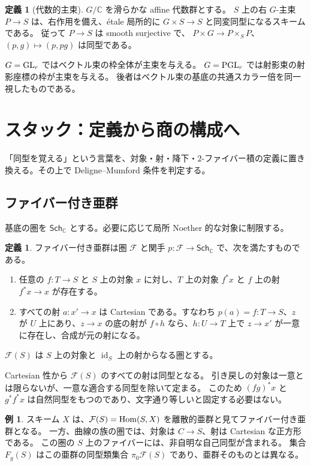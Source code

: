 \documentclass[dvipdfmx,a4paper,11pt]{article}
\theoremstyle{definition}
\newtheorem{dfn}[thm]{定義}
\newtheorem{exa}[thm]{例}
\newenvironment{aim}{\begin{tcolorbox}[mybox,colback=green!3,title=この章で考えること,fonttitle=\bfseries]}{\end{tcolorbox}}
\newcommand{\C}{\mathbb C}\newcommand{\R}{\mathbb R}\newcommand{\Z}{\mathbb Z}\newcommand{\Q}{\mathbb Q}
\newcommand{\id}{\operatorname{id}}
\begin{document}
\begin{dfn}[代数的主束]
$G/\C$ を滑らかな affine 代数群とする。
$S$ 上の右 $G$-主束 $P\to S$ は、右作用を備え、étale 局所的に $G\times S\to S$ と同変同型になるスキームである。
従って $P\to S$ は smooth surjective で、
$P\times G\to P\times_SP$、$(p,g)\mapsto(p,pg)$ は同型である。
\end{dfn}
$G=\operatorname{GL}_r$ ではベクトル束の枠全体が主束を与える。
$G=\operatorname{PGL}_r$ では射影束の射影座標の枠が主束を与える。
後者はベクトル束の基底の共通スカラー倍を同一視したものである。

\par\bigskip\Needspace{.70\textheight}
\section{スタック：定義から商の構成へ}\label{sec:stacks}
\begin{aim}
「同型を覚える」という言葉を、対象・射・降下・$2$-ファイバー積の定義に置き換える。その上で Deligne--Mumford 条件を判定する。
\end{aim}
\subsection{ファイバー付き亜群}
基底の圏を $\mathsf{Sch}_{\C}$ とする。必要に応じて局所 Noether 的な対象に制限する。
\begin{dfn}\label{def:cfg}
ファイバー付き亜群は圏 $\mathcal F$ と関手 $p:\mathcal F\to\mathsf{Sch}_{\C}$ で、次を満たすものである。
\begin{enumerate}
\item 任意の $f:T\to S$ と $S$ 上の対象 $x$ に対し、$T$ 上の対象 $f^*x$ と $f$ 上の射 $f^*x\to x$ が存在する。
\item すべての射 $a:x'\to x$ は Cartesian である。すなわち $p(a)=f:T\to S$、$z$ が $U$ 上にあり、$z\to x$ の底の射が $f\circ h$ なら、$h:U\to T$ 上で $z\to x'$ が一意に存在し、合成が元の射になる。
\end{enumerate}
$\mathcal F(S)$ は $S$ 上の対象と $\id_S$ 上の射からなる圏とする。
\end{dfn}
Cartesian 性から $\mathcal F(S)$ のすべての射は同型となる。
引き戻しの対象は一意とは限らないが、一意な適合する同型を除いて定まる。
このため $(fg)^*x$ と $g^*f^*x$ は自然同型をもつのであり、文字通り等しいと固定する必要はない。

\begin{exa}
スキーム $X$ は、$\mathcal F(S)=\operatorname{Hom}(S,X)$ を離散的亜群と見てファイバー付き亜群となる。
一方、曲線の族の圏では、対象は $C\to S$、射は Cartesian な正方形である。
この圏の $S$ 上のファイバーには、非自明な自己同型が含まれる。
集合 $F_g(S)$ はこの亜群の同型類集合 $\pi_0\mathcal F(S)$ であり、亜群そのものとは異なる。
\end{exa}
\end{document}
